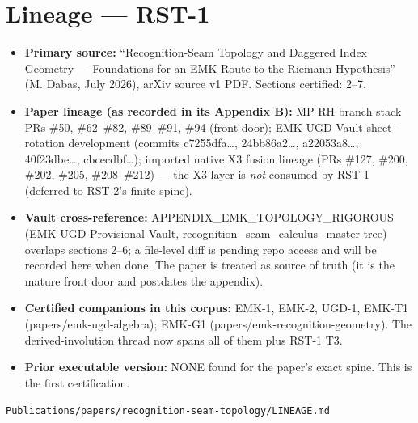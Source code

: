 \hypertarget{lineage-rst-1}{%
\chapter{Lineage --- RST-1}\label{lineage-rst-1}}

\begin{itemize}
\tightlist
\item
  \textbf{Primary source:} ``Recognition-Seam Topology and Daggered Index
  Geometry --- Foundations for an EMK Route to the Riemann Hypothesis''
  (M. Dabas, July 2026), arXiv source v1 PDF. Sections certified: 2--7.
\item
  \textbf{Paper lineage (as recorded in its Appendix B):} MP RH branch stack
  PRs \#50, \#62--\#82, \#89--\#91, \#94 (front door); EMK-UGD Vault
  sheet-rotation development (commits c7255dfa\ldots, 24bb86a2\ldots, a22053a8\ldots,
  40f23dbe\ldots, cbcecdbf\ldots); imported native X3 fusion lineage (PRs \#127,
  \#200, \#202, \#205, \#208--\#212) --- the X3 layer is \emph{not} consumed by
  RST-1 (deferred to RST-2's finite spine).
\item
  \textbf{Vault cross-reference:} APPENDIX\_EMK\_TOPOLOGY\_RIGOROUS
  (EMK-UGD-Provisional-Vault, recognition\_seam\_calculus\_master tree)
  overlaps sections 2--6; a file-level diff is pending repo access and
  will be recorded here when done. The paper is treated as source of
  truth (it is the mature front door and postdates the appendix).
\item
  \textbf{Certified companions in this corpus:} EMK-1, EMK-2, UGD-1, EMK-T1
  (papers/emk-ugd-algebra); EMK-G1 (papers/emk-recognition-geometry).
  The derived-involution thread now spans all of them plus RST-1 T3.
\item
  \textbf{Prior executable version:} NONE found for the paper's exact spine.
  This is the first certification.
\end{itemize}

\begin{flushright}\small\texttt{Publications/papers/recognition-seam-topology/LINEAGE.md}\end{flushright}
